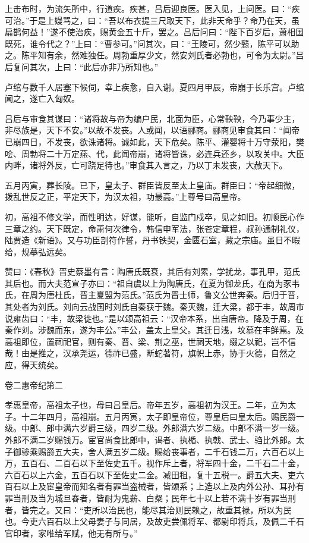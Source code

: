 \documentclass[12pt,UTF8]{ctexbook}
\begin{document}
上击布时，为流矢所中，行道疾。疾甚，吕后迎良医。医入见，上问医。曰：“疾可治。”于是上嫚骂之，曰：“吾以布衣提三尺取天下，此非天命乎？命乃在天，虽扁鹊何益！”遂不使治疾，赐黄金五十斤，罢之。吕后问曰：“陛下百岁后，萧相国既死，谁令代之？”上曰：“曹参可。”问其次，曰：“王陵可，然少戆，陈平可以助之。陈平知有余，然难独任。周勃重厚少文，然安刘氏者必勃也，可令为太尉。”吕后复问其次，上曰：“此后亦非乃所知也。”



卢绾与数千人居塞下候伺，幸上疾愈，自入谢。夏四月甲辰，帝崩于长乐宫。卢绾闻之，遂亡入匈奴。



吕后与审食其谋曰：“诸将故与帝为编户民，北面为臣，心常鞅鞅，今乃事少主，非尽族是，天下不安。”以故不发丧。人或闻，以语郦商。郦商见审食其曰：“闻帝已崩四日，不发丧，欲诛诸将。诚如此，天下危矣。陈平、灌婴将十万守荥阳，樊哙、周勃将二十万定燕、代，此闻帝崩，诸将皆诛，必连兵还乡，以攻关中。大臣内畔，诸将外反，亡可跷足待也。”审食其入言之，乃以丁未发丧，大赦天下。



五月丙寅，葬长陵。已下，皇太子、群臣皆反至太上皇庙。群臣曰：“帝起细微，拨乱世反之正，平定天下，为汉太祖，功最高。”上尊号曰高皇帝。



初，高祖不修文学，而性明达，好谋，能听，自监门戍卒，见之如旧。初顺民心作三章之约。天下既定，命萧何次律令，韩信申军法，张苍定章程，叔孙通制礼仪，陆贾造《新语》。又与功臣剖符作誓，丹书铁契，金匮石室，藏之宗庙。虽日不暇给，规摹弘远矣。



赞曰：《春秋》晋史蔡墨有言：陶唐氏既衰，其后有刘累，学扰龙，事孔甲，范氏其后也。而大夫范宣子亦曰：“祖自虞以上为陶唐氏，在夏为御龙氏，在商为豕韦氏，在周为唐杜氏，晋主夏盟为范氏。”范氏为晋士师，鲁文公世奔秦。后归于晋，其处者为刘氏。刘向云战国时刘氏自秦获于魏。秦灭魏，迁大梁，都于丰，故周市说雍齿曰：“丰，故梁徙也。”是以颂高祖云：“汉帝本系，出自唐帝。降及于周，在秦作刘。涉魏而东，遂为丰公。”丰公，盖太上皇父。其迁日浅，坟墓在丰鲜焉。及高祖即位，置祠祀官，则有秦、晋、梁、荆之巫，世祠天地，缀之以祀，岂不信哉！由是推之，汉承尧运，德祚已盛，断蛇著符，旗帜上赤，协于火德，自然之应，得天统矣。





卷二惠帝纪第二



孝惠皇帝，高祖太子也，母曰吕皇后。帝年五岁，高祖初为汉王。二年，立为太子。十二年四月，高祖崩。五月丙寅，太子即皇帝位，尊皇后曰皇太后。赐民爵一级。中郎、郎中满六岁爵三级，四岁二级。外郎满六岁二级。中郎不满一岁一级。外郎不满二岁赐钱万。宦官尚食比郎中，谒者、执楯、执戟、武士、驺比外郎。太子御骖乘赐爵五大夫，舍人满五岁二级。赐给丧事者，二千石钱二万，六百石以上万，五百石、二百石以下至佐史五千。视作斥上者，将军四十金，二千石二十金，六百石以上六金，五百石以下至佐史二金。减田租，复十五税一。爵五大夫、吏六百石以上及宦皇帝而知名者有罪当盗械者，皆颂系；上造以上及内外公孙、耳孙有罪当刑及当为城旦舂者，皆耐为鬼薪、白粲；民年七十以上若不满十岁有罪当刑者，皆完之。又曰：“吏所以治民也，能尽其治则民赖之，故重其禄，所以为民也。今吏六百石以上父母妻子与同居，及故吏尝佩将军、都尉印将兵，及佩二千石官印者，家唯给军赋，他无有所与。”
\end{document}
